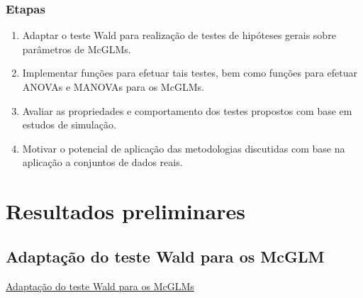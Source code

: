 \documentclass[10pt,
  aspectratio=169,
  serif,
  mathserif,
  professionalfont,
  compress,
  handout,
  ]{beamer}\usepackage[]{graphicx}\usepackage[]{color}
\begin{document}

\begin{frame}
  \frametitle{Etapas}

  \begin{enumerate}
    \itemsep 2ex

  \item Adaptar o teste Wald para realização de testes de hipóteses gerais sobre parâmetros de McGLMs. 
  
  \item Implementar funções para efetuar tais testes, bem como funções para efetuar ANOVAs e MANOVAs para os McGLMs. 

  \item Avaliar as propriedades e comportamento dos testes propostos com base em estudos de simulação.

  \item Motivar o potencial de aplicação das metodologias discutidas com base na aplicação a conjuntos de dados reais.

  \end{enumerate}

\end{frame}


\section{Resultados preliminares}


\subsection{Adaptação do teste Wald para os McGLM}


\begin{frame}[c, allowframebreaks]

\begin{center}

  {\normalsize \href{https://lineu96.github.io/st/}{Adaptação do teste Wald para os McGLMs}}
  
\end{center}

\end{frame}
\end{document}
